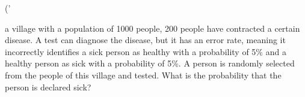 ('\documentclass{article}\n\usepackage{amsmath}\n\begin{document}\n\nIn a village with a population of 1000 people, 200 people have contracted a certain disease. A test can diagnose the disease, but it has an error rate, meaning it incorrectly identifies a sick person as healthy with a probability of 5\% and a healthy person as sick with a probability of 5\%. A person is randomly selected from the people of this village and tested. What is the probability that the person is declared sick?\n\n\end{document}',)
\begin{document}
\n\nA factory packages its products in cubic boxes and in the warehouse, every 212 boxes are connected together in the shape of a cube $8 \times 8 \times 8$. When the air temperature exceeds a certain limit, it is necessary to separate this set of 212 boxes with horizontal and vertical planes so that each box has at least one face that is not in contact with the faces of other boxes. What is the minimum number of planes required to achieve such a situation?\n\n
\end{document}
